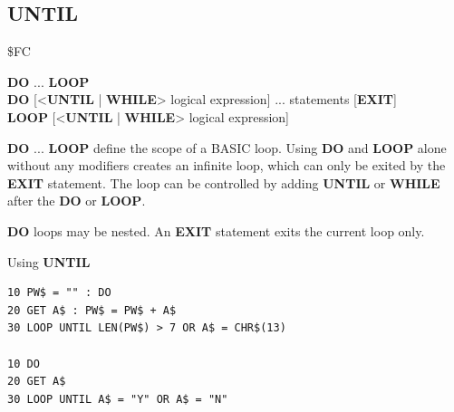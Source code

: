 \subsection{UNTIL}
\begin{description}[leftmargin=2cm,style=nextline]
\item [Token:]    \$FC

\item [Format:]   {\bf DO} ... {\bf LOOP} \\
                  {\bf DO} [<{\bf UNTIL} | {\bf WHILE}> logical expression] ... statements [{\bf EXIT}] \\
                  {\bf LOOP} [<{\bf UNTIL} | {\bf WHILE}> logical expression]

\item [Usage:]    {\bf DO} ... {\bf LOOP} define the scope of a BASIC loop. Using {\bf DO} and {\bf LOOP} alone without any modifiers creates an infinite loop, which can only be exited by the {\bf EXIT} statement. The loop can be controlled by adding {\bf UNTIL} or {\bf WHILE} after the {\bf DO} or {\bf LOOP}.

\item [Remarks:]  {\bf DO} loops may be nested. An {\bf EXIT} statement exits the current loop only.

\item [Examples:] Using {\bf UNTIL}

\begin{tcolorbox}[colback=black,coltext=white]
\verbatimfont{\codefont}
\begin{verbatim}
10 PW$ = "" : DO
20 GET A$ : PW$ = PW$ + A$
30 LOOP UNTIL LEN(PW$) > 7 OR A$ = CHR$(13)

10 DO
20 GET A$
30 LOOP UNTIL A$ = "Y" OR A$ = "N"
\end{verbatim}
\end{tcolorbox}
\end{description}


\newpage
